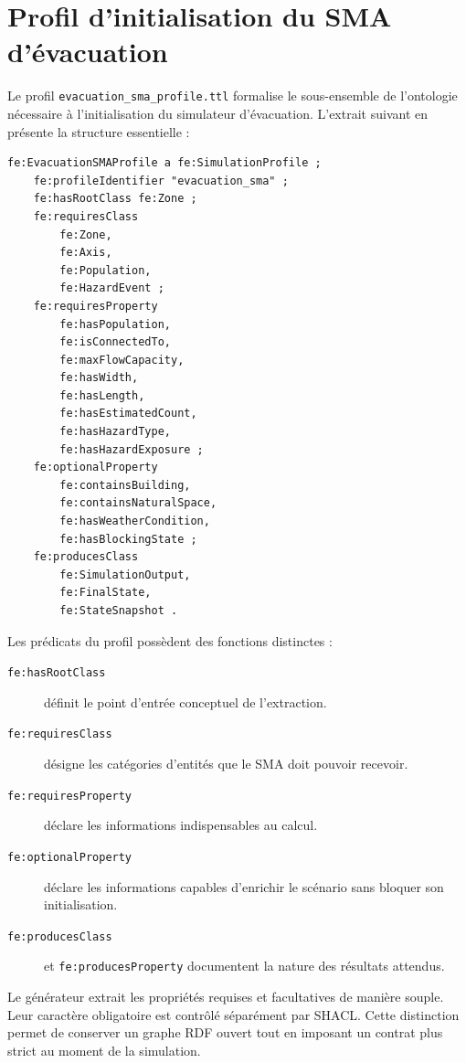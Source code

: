 \documentclass{article}
\begin{document}
\clearpage
\section{Profil d'initialisation du SMA d'évacuation}

Le profil \texttt{evacuation\_sma\_profile.ttl} formalise le sous-ensemble de l'ontologie nécessaire à l'initialisation du simulateur d'évacuation. L'extrait suivant en présente la structure essentielle :

\begin{lstlisting}[language=Turtle,caption={Structure simplifiée du profil SMA}]
fe:EvacuationSMAProfile a fe:SimulationProfile ;
    fe:profileIdentifier "evacuation_sma" ;
    fe:hasRootClass fe:Zone ;
    fe:requiresClass
        fe:Zone,
        fe:Axis,
        fe:Population,
        fe:HazardEvent ;
    fe:requiresProperty
        fe:hasPopulation,
        fe:isConnectedTo,
        fe:maxFlowCapacity,
        fe:hasWidth,
        fe:hasLength,
        fe:hasEstimatedCount,
        fe:hasHazardType,
        fe:hasHazardExposure ;
    fe:optionalProperty
        fe:containsBuilding,
        fe:containsNaturalSpace,
        fe:hasWeatherCondition,
        fe:hasBlockingState ;
    fe:producesClass
        fe:SimulationOutput,
        fe:FinalState,
        fe:StateSnapshot .
\end{lstlisting}

Les prédicats du profil possèdent des fonctions distinctes :

\begin{description}
    \item[\texttt{fe:hasRootClass}] définit le point d'entrée conceptuel de l'extraction.
    \item[\texttt{fe:requiresClass}] désigne les catégories d'entités que le SMA doit pouvoir recevoir.
    \item[\texttt{fe:requiresProperty}] déclare les informations indispensables au calcul.
    \item[\texttt{fe:optionalProperty}] déclare les informations capables d'enrichir le scénario sans bloquer son initialisation.
    \item[\texttt{fe:producesClass}] et \texttt{fe:producesProperty} documentent la nature des résultats attendus.
\end{description}

Le générateur extrait les propriétés requises et facultatives de manière souple. Leur caractère obligatoire est contrôlé séparément par SHACL. Cette distinction permet de conserver un graphe RDF ouvert tout en imposant un contrat plus strict au moment de la simulation.
\end{document}
